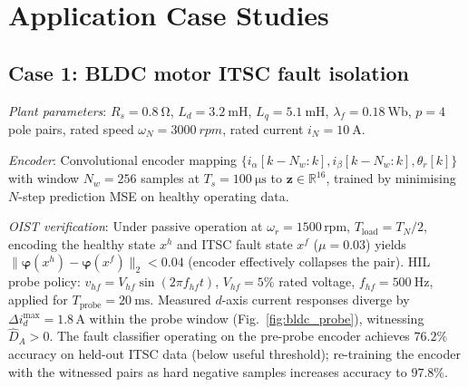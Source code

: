 \documentclass[10pt,twocolumn]{article}
\theoremstyle{plain}
\theoremstyle{definition}
\theoremstyle{remark}
\newcommand{\bvphi}{\bm{\varphi}}
\newcommand{\R}{\mathbb{R}}
\begin{document}
\section{Application Case Studies}
\label{sec:apps}

\subsection{Case 1: BLDC motor ITSC fault isolation}

\textit{Plant parameters}: $R_s = \SI{0.8}{\ohm}$, $L_d = \SI{3.2}{\milli\henry}$,
$L_q = \SI{5.1}{\milli\henry}$, $\lambda_f = \SI{0.18}{\weber}$,
$p = 4$ pole pairs, rated speed $\omega_N = \SI{3000}{rpm}$, rated current
$i_N = \SI{10}{\ampere}$.

\textit{Encoder}: Convolutional encoder mapping
$\{i_\alpha[k-N_w:k], i_\beta[k-N_w:k], \theta_r[k]\}$ with window
$N_w = 256$ samples at $T_s = \SI{100}{\micro\second}$ to
$\bm{z} \in \R^{16}$, trained by minimising $N$-step prediction MSE
on healthy operating data.

\textit{OIST verification}: Under passive operation at $\omega_r = 1500$\,rpm,
$T_{\text{load}} = T_N/2$, encoding the healthy state $x^h$ and ITSC fault state
$x^f$ ($\mu = 0.03$) yields $\|\bvphi(x^h) - \bvphi(x^f)\|_2 < 0.04$
(encoder effectively collapses the pair). HIL probe policy:
$v_{hf} = V_{hf}\sin(2\pi f_{hf} t)$, $V_{hf} = 5$\% rated voltage,
$f_{hf} = \SI{500}{\hertz}$, applied for $T_{\text{probe}} = \SI{20}{\milli\second}$.
Measured $d$-axis current responses diverge by $\Delta i_d^{\max} = 1.8$\,A
within the probe window (Fig.~\ref{fig:bldc_probe}), witnessing
$\hat{D}_A > 0$. The fault classifier operating on the pre-probe encoder
achieves $76.2$\% accuracy on held-out ITSC data (below useful threshold);
re-training the encoder with the witnessed pairs as hard negative samples
increases accuracy to $97.8$\%.
\end{document}
